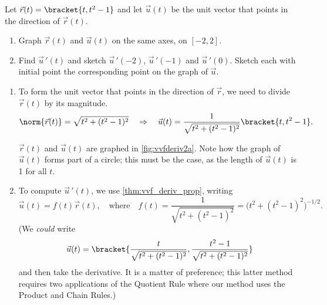 \begin{example}\label{ex_vvfderiv2}
Let $\vec r(t) =\bracket{t, t^2-1}$ and let $\vec u(t)$ be the unit vector that points in the direction of $\vec r(t)$.
\begin{enumerate}
	\item Graph $\vec r(t)$ and $\vec u(t)$ on the same axes, on $[-2,2]$.
	\item	Find $\vec u\,'(t)$ and sketch $\vec u\,'(-2)$, $\vec u\,'(-1)$ and $\vec u\,'(0)$. Sketch each with initial point the corresponding point on the graph of $\vec u$.
\end{enumerate}
\solution
\begin{enumerate}
	\item To form the unit vector that points in the direction of $\vec r$, we need to divide $\vec r(t)$ by its magnitude. 
	\[\norm{\vec r(t)} = \sqrt{t^2+(t^2-1)^2} \quad \Rightarrow \quad \vec u(t) = \frac{1}{\sqrt{t^2+(t^2-1)^2}}\bracket{t,t^2-1}.\]
	
	$\vec r(t)$ and $\vec u(t)$ are graphed in \autoref{fig:vvfderiv2a}. Note how the graph of $\vec u(t)$ forms part of a circle; this must be the case, as the length of $\vec u(t)$ is 1 for all $t$.

	
	\item		To compute $\vec u\,'(t)$, we use \autoref{thm:vvf_deriv_prop}, writing
	\[\vec u(t) = f(t)\vec r(t),\quad  \text{where}\quad f(t) = \frac{1}{\sqrt{t^2+(t^2-1)^2}}=\bigl(t^2+(t^2-1)^2\bigr)^{-1/2}.\]
	(We \emph{could} write
	\[\vec u(t) =\bracket{\frac{t}{\sqrt{t^2+(t^2-1)^2}}, \frac{t^2-1}{\sqrt{t^2+(t^2-1)^2}}}\]
	and then take the derivative. It is a matter of preference; this latter method requires two applications of the Quotient Rule where our method uses the Product and Chain Rules.)
	

\end{enumerate}
\end{example}
